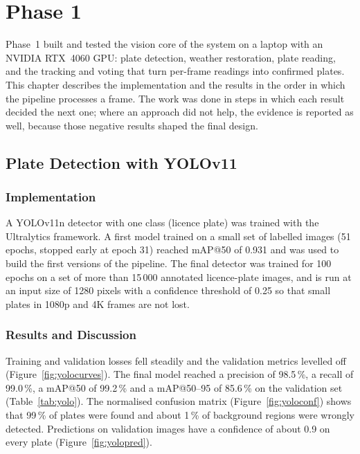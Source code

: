 \chapter{Phase 1}
\label{ch:phase1}

Phase~1 built and tested the vision core of the system on a laptop with an
NVIDIA RTX~4060 GPU: plate detection, weather restoration, plate reading, and
the tracking and voting that turn per-frame readings into confirmed plates.
This chapter describes the implementation and the results in the order in
which the pipeline processes a frame. The work was done in steps in which each
result decided the next one; where an approach did not help, the evidence is
reported as well, because those negative results shaped the final design.

\section{Plate Detection with YOLOv11}
\label{sec:yolo}

\subsection{Implementation}

A YOLOv11n detector with one class (licence plate) was trained with the
Ultralytics framework. A first model trained on a small set of labelled images
(51 epochs, stopped early at epoch 31) reached mAP@50 of 0.931 and was used
to build the first versions of the pipeline. The final detector was trained for
100 epochs on a set of more than 15\,000 annotated licence-plate images, and is
run at an input size of 1280 pixels with a confidence threshold of 0.25 so that
small plates in 1080p and 4K frames are not lost.

\subsection{Results and Discussion}

Training and validation losses fell steadily and the validation metrics levelled
off (Figure~\ref{fig:yolocurves}). The final model reached a precision of
98.5\,\%, a recall of 99.0\,\%, a mAP@50 of 99.2\,\% and a mAP@50--95 of
85.6\,\% on the validation set (Table~\ref{tab:yolo}). The normalised confusion
matrix (Figure~\ref{fig:yoloconf}) shows that 99\,\% of plates were found and
about 1\,\% of background regions were wrongly detected. Predictions on
validation images have a confidence of about 0.9 on every plate
(Figure~\ref{fig:yolopred}).

